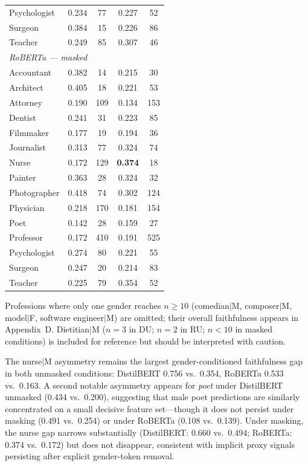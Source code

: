 \documentclass[11pt]{article}
\begin{document}
\begin{longtable}{lcccc}
Psychologist  & 0.234 &  77 & 0.227 &  52 \\
Surgeon       & 0.384 &  15 & 0.226 &  86 \\
Teacher       & 0.249 &  85 & 0.307 &  46 \\
\midrule
\multicolumn{5}{l}{\textit{RoBERTa --- masked}} \\
\midrule
Accountant    & 0.382 &  14 & 0.215 &  30 \\
Architect     & 0.405 &  18 & 0.221 &  53 \\
Attorney      & 0.190 & 109 & 0.134 & 153 \\
Dentist       & 0.241 &  31 & 0.223 &  85 \\
Filmmaker     & 0.177 &  19 & 0.194 &  36 \\
Journalist    & 0.313 &  77 & 0.324 &  74 \\
Nurse         & 0.172 & 129 & \textbf{0.374} & 18 \\
Painter       & 0.363 &  28 & 0.324 &  32 \\
Photographer  & 0.418 &  74 & 0.302 & 124 \\
Physician     & 0.218 & 170 & 0.181 & 154 \\
Poet          & 0.142 &  28 & 0.159 &  27 \\
Professor     & 0.172 & 410 & 0.191 & 525 \\
Psychologist  & 0.274 &  80 & 0.221 &  55 \\
Surgeon       & 0.247 &  20 & 0.214 &  83 \\
Teacher       & 0.225 &  79 & 0.354 &  52 \\
\end{longtable}
\normalsize
{\small Professions where only one gender reaches $n \geq 10$ (comedian$|$M,
composer$|$M, model$|$F, software engineer$|$M) are omitted; their
overall faithfulness appears in Appendix~D. Dietitian$|$M ($n{=}3$ in
DU; $n{=}2$ in RU; $n < 10$ in masked conditions) is included for
reference but should be interpreted with caution.}

\vspace{4pt}
{\small The nurse$|$M asymmetry remains the largest gender-conditioned
faithfulness gap in both unmasked conditions: DistilBERT 0.756
vs.\ 0.354, RoBERTa 0.533 vs.\ 0.163. A second notable asymmetry
appears for \emph{poet} under DistilBERT unmasked (0.434 vs.\ 0.200),
suggesting that male poet predictions are similarly concentrated on
a small decisive feature set---though it does not persist under
masking (0.491 vs.\ 0.254) or under RoBERTa (0.108 vs.\ 0.139).
Under masking, the nurse gap narrows substantially
(DistilBERT: 0.660 vs.\ 0.494; RoBERTa: 0.374 vs.\ 0.172)
but does not disappear, consistent with implicit proxy signals
persisting after explicit gender-token removal.}



\end{document}
